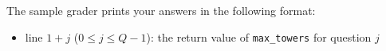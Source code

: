 The sample grader prints your answers in the following format:
\begin{itemize}
    \item line $1 + j$ ($0 \le j \le Q - 1$): the return value of \texttt{max\_towers} for question $j$
\end{itemize}



